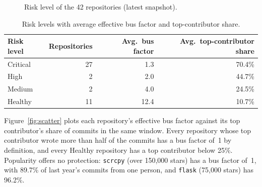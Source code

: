\documentclass[11pt,a4paper]{report}
\begin{document}
\begin{figure}[H]
\centering
{}
\caption{Risk level of the 42 repositories (latest snapshot).}
\label{fig:dist}
\end{figure}

\begin{table}[H]
\centering
\caption{Risk levels with average effective bus factor and top-contributor share.}
\label{tab:dist}
\small
\begin{tabular}{lrrr}
\toprule
\textbf{Risk level} & \textbf{Repositories} & \textbf{Avg.\ bus factor} & \textbf{Avg.\ top-contributor share} \\
\midrule
Critical & 27 & 1.3 & 70.4\% \\
High & 2 & 2.0 & 44.7\% \\
Medium & 2 & 4.0 & 24.5\% \\
Healthy & 11 & 12.4 & 10.7\% \\
\bottomrule
\end{tabular}
\end{table}

Figure~\ref{fig:scatter} plots each repository's effective bus factor against
its top contributor's share of commits in the same window. Every repository
whose top contributor wrote more than half of the commits has a bus factor of~1
by definition, and every Healthy repository has a top contributor below 25\%.
Popularity offers no protection: \texttt{scrcpy} (over 150,000 stars) has a
bus factor of~1, with 89.7\% of last year's commits from one person, and
\texttt{flask} (75,000 stars) has 96.2\%.
\end{document}
